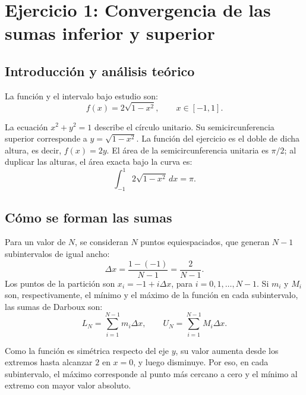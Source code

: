 
\renewcommand{\lstlistingname}{Código}

\section{Ejercicio 1: Convergencia de las sumas inferior y superior}

\subsection{Introducción y análisis teórico}

La función y el intervalo bajo estudio son:
\[
f(x)=2\sqrt{1-x^2}, \qquad x\in[-1,1].
\]

La ecuación \(x^2+y^2=1\) describe el círculo unitario. Su semicircunferencia superior corresponde a \(y=\sqrt{1-x^2}\). La función del ejercicio es el doble de dicha altura, es decir, \(f(x)=2y\). El área de la semicircunferencia unitaria es \(\pi/2\); al duplicar las alturas, el área exacta bajo la curva es:
\[
\int_{-1}^{1}2\sqrt{1-x^2}\,dx=\pi.
\]

\subsection{Cómo se forman las sumas}

Para un valor de \(N\), se consideran \(N\) puntos equiespaciados, que generan \(N-1\) subintervalos de igual ancho:
\[
\Delta x=\frac{1-(-1)}{N-1}=\frac{2}{N-1}.
\]
Los puntos de la partición son \(x_i=-1+i\Delta x\), para \(i=0,1,\ldots,N-1\). Si \(m_i\) y \(M_i\) son, respectivamente, el mínimo y el máximo de la función en cada subintervalo, las sumas de Darboux son:
\[
L_N=\sum_{i=1}^{N-1}m_i\Delta x,\qquad
U_N=\sum_{i=1}^{N-1}M_i\Delta x.
\]

Como la función es simétrica respecto del eje \(y\), su valor aumenta desde los extremos hasta alcanzar \(2\) en \(x=0\), y luego disminuye. Por eso, en cada subintervalo, el máximo corresponde al punto más cercano a cero y el mínimo al extremo con mayor valor absoluto.

